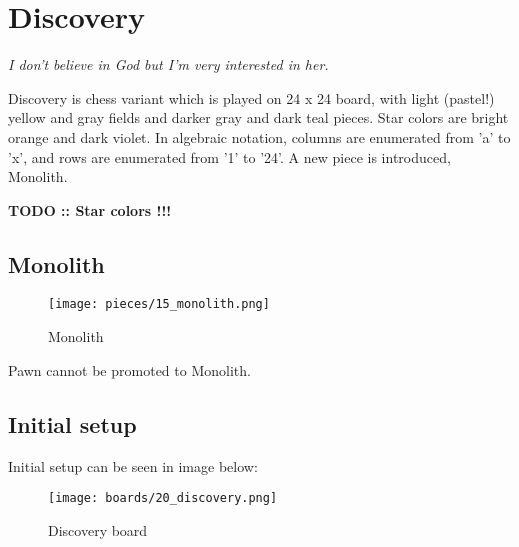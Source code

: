 
\chapter*{Discovery}

\begin{flushright}
\parbox{0.8\textwidth}{
\emph{I don’t believe in God but I’m very interested in her. \\
 } }
\end{flushright}

\noindent
Discovery is chess variant which is played on 24 x 24 board, with
light (pastel!) yellow and gray fields and darker gray and dark teal
pieces. Star colors are bright orange and dark violet. In algebraic
notation, columns are enumerated from 'a' to 'x', and rows are
enumerated from '1' to '24'. A new piece is introduced, Monolith.

\textbf{\huge{TODO :: Star colors !!!}} %

\clearpage %

\section*{Monolith}

\noindent
\begin{wrapfigure}{l}{0.4\textwidth}
\texttt{[image: pieces/15\_monolith.png]}
\caption{Monolith}
\label{fig:15_monolith}
\end{wrapfigure}

Pawn cannot be promoted to Monolith.

\clearpage %

\section*{Initial setup}

Initial setup can be seen in image below:

\noindent
\begin{figure}[h]
\texttt{[image: boards/20\_discovery.png]}
\caption{Discovery board}
\label{fig:20_discovery}
\end{figure}

\clearpage %

